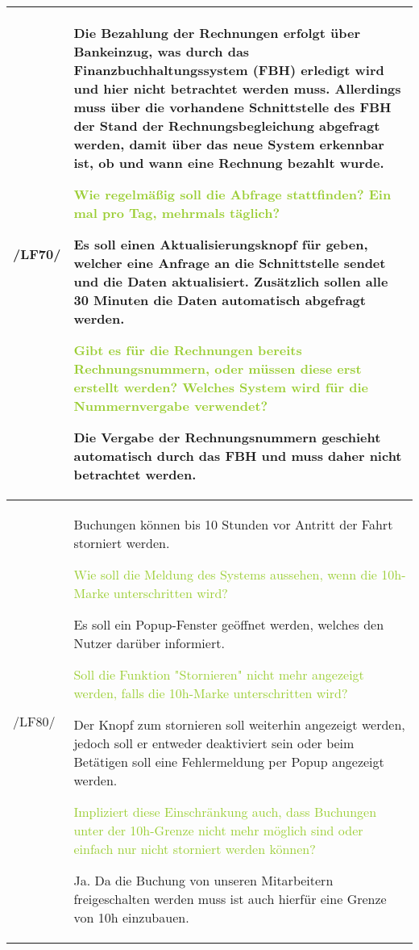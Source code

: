 \begin{tabular}[ht] {l | p{13cm}}
    \hline
    /LF70/ & Die Bezahlung der Rechnungen erfolgt über Bankeinzug, was durch das Finanzbuchhaltungssystem (FBH) erledigt wird und hier nicht betrachtet werden muss. Allerdings muss über die vorhandene Schnittstelle des FBH der Stand der Rechnungsbegleichung abgefragt werden, damit über das neue System erkennbar ist, ob und wann eine Rechnung bezahlt wurde. 
    


    \textcolor{YellowGreen}{Wie regelmäßig soll die Abfrage stattfinden? Ein mal pro Tag, mehrmals täglich?}

    \textcolor{NavyBlue}{Es soll einen Aktualisierungsknopf für geben, welcher eine Anfrage an die Schnittstelle sendet und die Daten aktualisiert. Zusätzlich sollen alle 30 Minuten die Daten automatisch abgefragt werden.}

    \textcolor{YellowGreen}{Gibt es für die Rechnungen bereits Rechnungsnummern, oder müssen diese erst erstellt werden? Welches System wird für die Nummernvergabe verwendet?}
    
    \textcolor{NavyBlue}{Die Vergabe der Rechnungsnummern geschieht automatisch durch das FBH und muss daher nicht betrachtet werden.}
    \\
    \hline
    /LF80/ & Buchungen können bis 10 Stunden vor Antritt der Fahrt storniert werden. 
    
    \textcolor{YellowGreen}{Wie soll die Meldung des Systems aussehen, wenn die 10h-Marke unterschritten wird?}

    \textcolor{NavyBlue}{Es soll ein Popup-Fenster geöffnet werden, welches den Nutzer darüber informiert.}

    \textcolor{YellowGreen}{Soll die Funktion "Stornieren" nicht mehr angezeigt werden, falls die 10h-Marke unterschritten wird?}

    \textcolor{NavyBlue}{Der Knopf zum stornieren soll weiterhin angezeigt werden, jedoch soll er entweder deaktiviert sein oder beim Betätigen soll eine Fehlermeldung per Popup angezeigt werden.}

    \textcolor{YellowGreen}{Impliziert diese Einschränkung auch, dass Buchungen unter der 10h-Grenze nicht mehr möglich sind oder einfach nur nicht storniert werden können?}

    \textcolor{NavyBlue}{Ja. Da die Buchung von unseren Mitarbeitern freigeschalten werden muss ist auch hierfür eine Grenze von 10h einzubauen.}
    \\
    \hline
\end{tabular}


